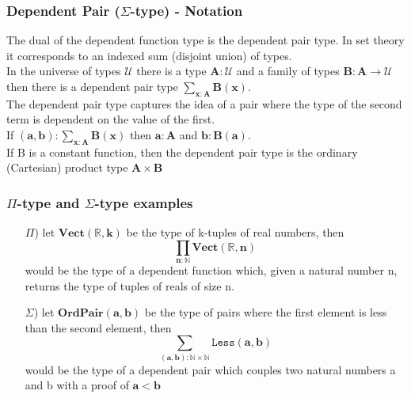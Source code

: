 \begin{frame}
\frametitle{Dependent Pair ($\Sigma$-type) - Notation}
The dual of the dependent function type is the dependent pair type. In set theory it corresponds to an indexed sum (disjoint union) of types.\\ 
\medskip 
In the universe of types $\pmb{\mathcal{U}}$ there is a type $\pmb{A:\mathcal{U}}$ and a family of types $\pmb{B : A \rightarrow \mathcal{U}}$\\
then there is a dependent pair type
$\pmb{\sum_{x:A}B(x)}$.\\ \medskip
The dependent pair type captures the idea of a pair where the type of the second term is dependent on the value of the first.\\
If $\pmb{(a,b):\sum_{x:A}B(x)}$
then $\pmb{a:A}$ and $\pmb{b:B(a)}$.\\ \medskip
If B is a constant function, then the dependent pair type is the ordinary (Cartesian) product type $\pmb{A×B}$
\end{frame}

 
\begin{frame}
\frametitle{$\Pi$-type and $\Sigma$-type examples}
\begin{itemize}
	\item[$\Pi$)] let $\pmb{Vect(\mathbb{R}, k)}$ be the type of k-tuples of real numbers, then
	\[\pmb{\prod_{n:\mathbb{N}}Vect(\mathbb{R}, n)}\]
	would be the type of a dependent function which, given a natural number n, returns the type of tuples of reals of size n.
	
	\item[$\Sigma$)] let $\pmb{OrdPair(a,b)}$ be the type of pairs where the first element is less than the second element, then \[\pmb{\sum_{(a,b) : \mathbb{N} \times \mathbb{N}} \mathtt{Less}(a,b)}\]
	 would be the type of a dependent pair which couples two natural numbers a and b with a proof of $\pmb{a<b}$

\end{itemize}
\end{frame}

